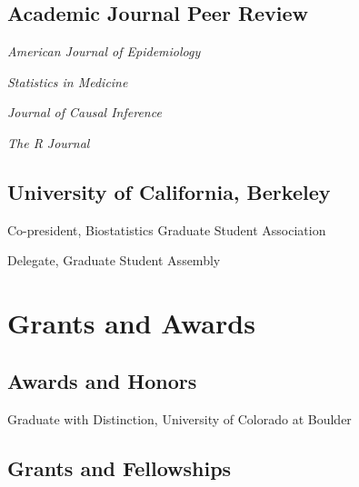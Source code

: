 \documentclass[12pt,letterpaper]{report}
\newcommand{\listitemspace}{0.15em}
\renewenvironment{itemize}
{\begin{list}{}{\setlength{\leftmargin}{0em}
            \setlength{\parskip}{0em}
            \setlength{\itemsep}{\listitemspace}
            \setlength{\parsep}{\listitemspace}}}
    {\end{list}}
\begin{document}
    \subsection*{Academic Journal Peer Review}
    
    \begin{itemize}
    
    	\item \textit{American Journal of Epidemiology}
    
    	\item \textit{Statistics in Medicine}
	
	\item \textit{Journal of Causal Inference}
    
    	\item \textit{The R Journal}
    
    \end{itemize}
    
    \subsection*{University of California, Berkeley}
    
       \begin{tablist}
    
    	\item[2026-2027] \tab Co-president, Biostatistics Graduate Student Association
	
    	\item[2026-2027] \tab Delegate, Graduate Student Assembly
    
    \end{tablist}

    \section*{Grants and Awards}

    \subsection*{Awards and Honors}

    \begin{tablist}

        \item[2017] \tab Graduate with Distinction, University of Colorado at Boulder

    \end{tablist}

    \subsection*{Grants and Fellowships}
\end{document}
